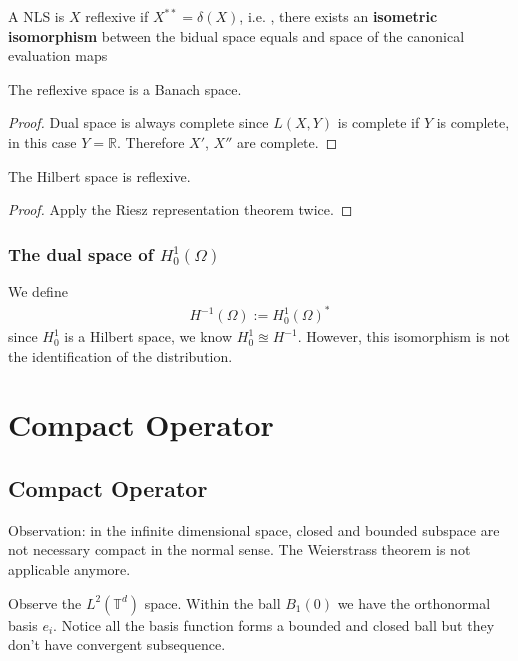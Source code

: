 \begin{definition}
	A NLS is $X$ reflexive if $X^{**} = \delta(X)$, i.e. , there exists an \textbf{isometric isomorphism} between the bidual space equals and space of the canonical evaluation maps
\end{definition}

\begin{remark}
The reflexive space is a Banach space.
\begin{proof}
	Dual space is always complete since $L(X,Y)$ is complete if $Y$ is complete, in this case $Y = \mathbb{R}$. Therefore $X'$, $X''$ are complete.
\end{proof}	
\end{remark}

\begin{theorem}
	The Hilbert space is reflexive.
\end{theorem}
\begin{proof}
	Apply the Riesz representation theorem twice.
\end{proof}


\subsubsection{The dual space of $H^1_0(\Omega)$}
We define
\begin{align*}
	H^{-1}(\Omega) := H_0^1(\Omega)^* 
\end{align*}
since $H^1_0$ is a Hilbert space, we know $H_0^1 \approxeq H^{-1}$. However, this isomorphism is not the identification of the distribution. 


\newpage

\section{Compact Operator}
\subsection{Compact Operator}
Observation: in the infinite dimensional space, closed and bounded subspace are not necessary compact in the normal sense. The Weierstrass theorem is not applicable anymore. 

\begin{example}
Observe the $L^2(\mathbb{T}^d)$ space. Within the ball $B_1(0)$ we have the orthonormal basis $e_i$. Notice all the basis function forms a bounded and closed ball but they don't have convergent subsequence. 
\end{example}

